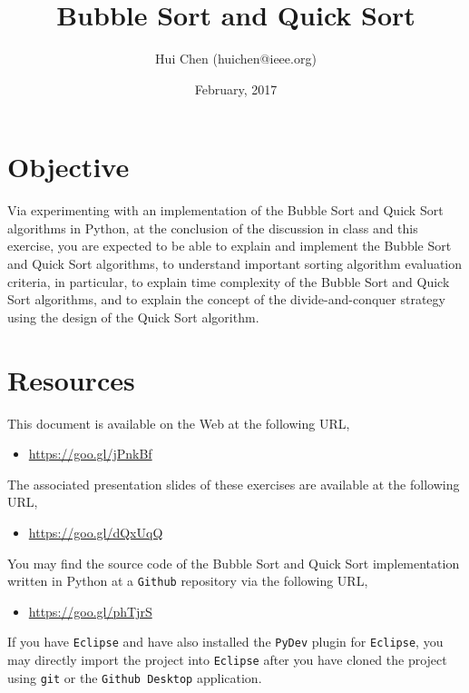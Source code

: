 \documentclass[11pt,letterpaper]{article}
\title{Bubble Sort and Quick Sort}
\author{Hui Chen (huichen@ieee.org)}
\date{February, 2017}
\begin{document}
\maketitle
\thispagestyle{firstpage}

\section{Objective}
Via experimenting with an implementation of the Bubble Sort and Quick Sort
algorithms in Python, at the conclusion of the discussion in class and this
exercise, you are expected to be able to explain and implement the Bubble Sort
and Quick Sort algorithms, to understand important sorting algorithm evaluation
criteria, in particular, to explain time complexity of the Bubble Sort and
Quick Sort algorithms, and to explain the concept of the divide-and-conquer
strategy using the design of the Quick Sort algorithm.

\section{Resources}

This document is available on the Web at the following URL,

\begin{itemize}
    \item \url{https://goo.gl/jPnkBf}
\end{itemize}

The associated presentation slides of these exercises are available at
the following URL,

\begin{itemize}
    \item \url{https://goo.gl/dQxUqQ}
\end{itemize}


You may find the source code of the Bubble Sort and Quick Sort implementation
written in Python at a \texttt{Github} repository via the following URL,

\begin{itemize}
    \item \url{https://goo.gl/phTjrS}
\end{itemize}

\noindent If you have \texttt{Eclipse} and have also installed the
\texttt{PyDev} plugin for \texttt{Eclipse}, you may directly import the project
into \texttt{Eclipse} after you have cloned the project using \texttt{git} or
the \texttt{Github Desktop} application. 
\end{document}
